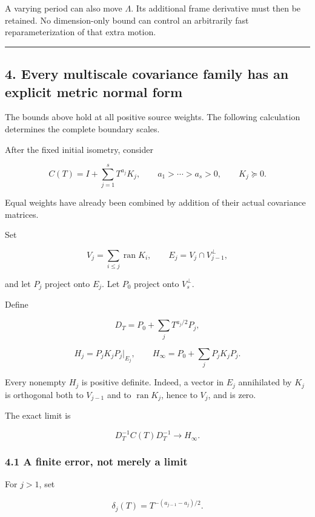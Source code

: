 \documentclass[11pt]{article}
\begin{document}
A varying period can also move \(\Lambda\). Its additional frame derivative must then be retained. No dimension-only bound can control an arbitrarily fast reparameterization of that extra motion.

\begin{center}\rule{0.5\linewidth}{0.5pt}\end{center}

\subsection{4. Every multiscale covariance family has an explicit metric normal form}\label{every-multiscale-covariance-family-has-an-explicit-metric-normal-form}

The bounds above hold at all positive source weights. The following calculation determines the complete boundary scales.

After the fixed initial isometry, consider

\[
C(T)=I+\sum_{j=1}^sT^{a_j}K_j,
\qquad
a_1>\cdots>a_s>0,
\qquad K_j\succeq0.
\tag{24}
\]

Equal weights have already been combined by addition of their actual covariance matrices.

Set

\[
V_j=\sum_{i\le j}\operatorname{ran}K_i,
\qquad
E_j=V_j\cap V_{j-1}^{\perp},
\]

and let \(P_j\) project onto \(E_j\). Let \(P_0\) project onto \(V_s^\perp\).

Define

\[
D_T=P_0+\sum_jT^{a_j/2}P_j,
\]

\[
H_j=P_jK_jP_j|_{E_j},
\qquad
H_\infty=P_0+\sum_jP_jK_jP_j.
\tag{25}
\]

Every nonempty \(H_j\) is positive definite. Indeed, a vector in \(E_j\) annihilated by \(K_j\) is orthogonal both to \(V_{j-1}\) and to \(\operatorname{ran}K_j\), hence to \(V_j\), and is zero.

The exact limit is

\[
\boxed{
D_T^{-1}C(T)D_T^{-1}\longrightarrow H_\infty.
}
\tag{26}
\]

\subsubsection{4.1 A finite error, not merely a limit}\label{a-finite-error-not-merely-a-limit}

For \(j>1\), set

\[
\delta_j(T)=T^{-(a_{j-1}-a_j)/2}.
\]
\end{document}
